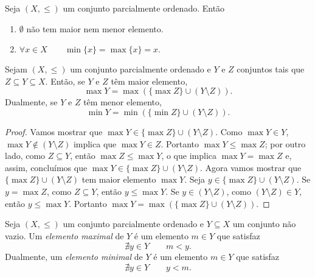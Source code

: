 \begin{prop}
	Seja $(X,\leq)$ um conjunto parcialmente ordenado. Então
	\begin{enumerate}
	\item $\emptyset$ não tem maior  nem menor elemento.
	\item $\forall x \in X \qquad \min\{x\}=\max\{x\} = x.$
	\end{enumerate}
\end{prop}

\begin{prop}
	Sejam $(X,\leq)$ um conjunto parcialmente ordenado e $Y$ e $Z$ conjuntos tais que $Z \subseteq Y \subseteq X$. Então, se $Y$ e $Z$ têm maior elemento,
	\begin{equation*}
	\max Y = \max(\{\max Z\} \cup (Y \setminus Z)).
	\end{equation*}
Dualmente, se $Y$ e $Z$ têm menor elemento,
	\begin{equation*}
	\min Y = \min(\{\min Z\} \cup (Y \setminus Z)).
	\end{equation*}
\end{prop}
\begin{proof}
	Vamos mostrar que $\max Y \in \{\max Z\} \cup (Y \setminus Z)$. Como $\max Y \in Y$, $\max Y \notin (Y \setminus Z)$ implica que $\max Y \in Z$. Portanto $\max Y \leq \max Z$; por outro lado, como $Z \subseteq Y$, então $\max Z \leq \max Y$, o que implica $\max Y = \max Z$ e, assim, concluímos que $\max Y \in \{\max Z\} \cup (Y \setminus Z)$. Agora vamos mostrar que $\{\max Z\} \cup (Y \setminus Z)$ tem maior elemento $\max Y$. Seja $y \in \{\max Z\} \cup (Y \setminus Z)$. Se $y = \max Z$, como $Z \subseteq Y$, então $y \leq \max Y$. Se $y \in (Y \setminus Z)$, como $(Y \setminus Z) \in Y$, então $y \leq \max Y$. Portanto $\max Y = \max(\{\max Z\} \cup (Y \setminus Z))$.
\end{proof}

\begin{defi}
	Seja $(X,\leq)$ um conjunto parcialmente ordenado e $Y \subseteq X$ um conjunto não vazio. Um \emph{elemento maximal} de $Y$ é um elemento $m \in Y$ que satisfaz
	\begin{equation*}
	\nexists y \in Y \qquad m < y.
	\end{equation*}
Dualmente, um \emph{elemento minimal} de $Y$ é um elemento $m \in Y$ que satisfaz
	\begin{equation*}
	\nexists y \in Y \qquad y < m.
	\end{equation*}
\end{defi}

